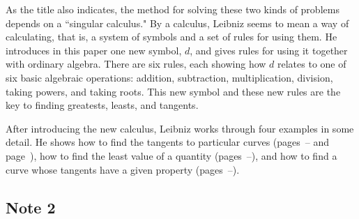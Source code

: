 \documentclass[twoside,openright]{article}
\begin{document}
As the title also indicates, the method for solving these two kinds of problems depends on a ``singular calculus."   By a calculus, Leibniz seems to mean a way of calculating, that is, a system of symbols and a set of rules for using them.  He introduces in this paper one new symbol, $d$, and gives rules for using it together with ordinary algebra.   There are six rules, each showing how $d$ relates to one of six basic algebraic operations: addition, subtraction, multiplication, division, taking powers, and taking roots.  This new symbol and these new rules are the key to finding greatests, leasts, and tangents.  

After introducing the new calculus, Leibniz works through four examples in some detail.  He shows how to find the tangents to particular curves (pages~\pageref{bnmex1}--\pageref{enmex1} and page~\pageref{begdeb}), how to find the least value of a quantity (pages~\pageref{bnmex2}--\pageref{enmex2}), and how to find a curve whose tangents have a given property (pages~\pageref{bnmex3}--\pageref{enmex3}).


\subsection*{Note 2}
\label{cnm2}
\end{document}
